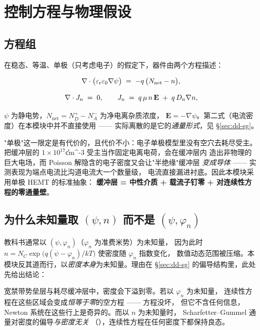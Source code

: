 \section{控制方程与物理假设}
\label{sec:dd-model}

\subsection{方程组}
\label{sec:dd-equations}

在稳态、等温、单极（只考虑电子）的假定下，器件由两个方程描述：

\begin{equation}
\nabla\cdot\bigl(\varepsilon_{\mathrm{r}}\varepsilon_{0}\nabla\psi\bigr) \;=\; -q\,\bigl(N_{\text{net}} - n\bigr),
\label{eq:dd-poisson}
\end{equation}

\begin{equation}
\nabla\cdot J_{n} \;=\; 0,
\qquad
J_{n} \;=\; q\,\mu\,n\,\mathbf{E} \;+\; q\,D_n\nabla n ,
\label{eq:dd-continuity}
\end{equation}

$\psi$ 为静电势，$N_{\text{net}}=N_D^{+}-N_A^{-}$ 为净电离杂质浓度，
$\mathbf{E}=-\nabla\psi$。第二式（电流密度）在本模块中并不直接使用 ——
实际离散的是它的\emph{通量形式}，见 \S\ref{sec:dd-sg}。

"单极"这一限定是有代价的，且代价不小：电子单极模型里没有空穴去耗尽受主。
把缓冲层的 $1\times10^{17}$\U{cm^{-3}} 受主当作固定电离电荷，会在缓冲层内
造出非物理的巨大电场，而 Poisson 解隐含的电子密度又会让"半绝缘"缓冲层
\emph{变成导体} —— 实测表现为端点电流比沟道电流大一个数量级，
电流直接漏进衬底。因此本模块采用单极 HEMT 的标准抽象：
\textbf{缓冲层 = 中性介质 + 载流子钉零 + 对连续性方程的零通量壁}。

\subsection{为什么未知量取 $(\psi,n)$ 而不是 $(\psi,\varphi_n)$}
\label{sec:dd-unknowns}

教科书通常以 $(\psi,\varphi_n)$（$\varphi_n$ 为准费米势）为未知量，
因为此时
$n=N_C\exp\!\bigl(q(\psi-\varphi_n)/kT\bigr)$ 使密度随 $\varphi_n$ 指数变化，
数值动态范围被压缩。本模块反其道而行，以\emph{密度本身}为未知量。理由在
\S\ref{sec:dd-sg} 的偏导结构里，此处先给出结论：

宽禁带势垒层与耗尽缓冲层中，密度会下溢到零。若以 $\varphi_n$ 为未知量，
连续性方程在这些区域会变成\emph{恒等于零}的空方程 —— 方程没坏，
但它不含任何信息，Newton 系统在这些行上是奇异的。而以 $n$ 为未知量时，
Scharfetter--Gummel 通量对密度的偏导\emph{与密度无关}
（），连续性方程在任何密度下都保持良态。

